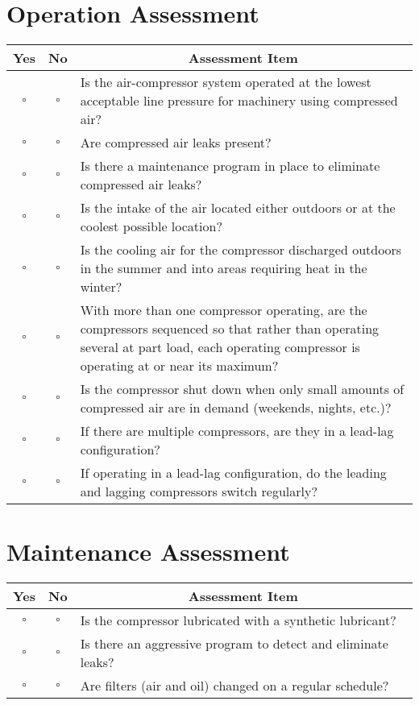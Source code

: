 \documentclass[./main.tex]{subfiles}
\begin{document}
\section*{Operation Assessment}
\begin{tabular}{|c|c|p{14cm}|}
\hline
\multicolumn{1}{|c|}{\textbf{Yes}} & \multicolumn{1}{c|}{\textbf{No}} & \multicolumn{1}{c|}{\textbf{Assessment Item}} \\
\hline
$\square$ & $\square$ & Is the air-compressor system operated at the lowest acceptable line pressure for machinery using compressed air? \\
\hline
$\square$ & $\square$ & Are compressed air leaks present? \\
\hline
$\square$ & $\square$ & Is there a maintenance program in place to eliminate compressed air leaks? \\
\hline
$\square$ & $\square$ & Is the intake of the air located either outdoors or at the coolest possible location? \\
\hline
$\square$ & $\square$ & Is the cooling air for the compressor discharged outdoors in the summer and into areas requiring heat in the winter? \\
\hline
$\square$ & $\square$ & With more than one compressor operating, are the compressors sequenced so that rather than operating several at part load, each operating compressor is operating at or near its maximum? \\
\hline
$\square$ & $\square$ & Is the compressor shut down when only small amounts of compressed air are in demand (weekends, nights, etc.)? \\
\hline
$\square$ & $\square$ & If there are multiple compressors, are they in a lead-lag configuration? \\
\hline
$\square$ & $\square$ & If operating in a lead-lag configuration, do the leading and lagging compressors switch regularly? \\
\hline
\end{tabular}

\vspace{1cm}

\section*{Maintenance Assessment}

\begin{tabular}{|c|c|p{14cm}|}
\hline
\multicolumn{1}{|c|}{\textbf{Yes}} & \multicolumn{1}{c|}{\textbf{No}} & \multicolumn{1}{c|}{\textbf{Assessment Item}} \\
\hline
$\square$ & $\square$ & Is the compressor lubricated with a synthetic lubricant? \\
\hline
$\square$ & $\square$ & Is there an aggressive program to detect and eliminate leaks? \\
\hline
$\square$ & $\square$ & Are filters (air and oil) changed on a regular schedule? \\
\hline
\end{tabular}
\end{document}
